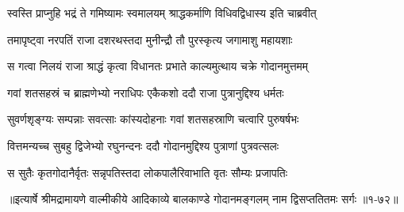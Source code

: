\twolineshloka
{स्वस्ति प्राप्नुहि भद्रं ते गमिष्यामः स्वमालयम्}
{श्राद्धकर्माणि विधिवद्विधास्य इति चाब्रवीत्} %

\twolineshloka
{तमापृष्ट्वा नरपतिं राजा दशरथस्तदा}
{मुनीन्द्रौ तौ पुरस्कृत्य जगामाशु महायशाः} %

\twolineshloka
{स गत्वा निलयं राजा श्राद्धं कृत्वा विधानतः}
{प्रभाते काल्यमुत्थाय चक्रे गोदानमुत्तमम्} %

\twolineshloka
{गवां शतसहस्रं च ब्राह्मणेभ्यो नराधिपः}
{एकैकशो ददौ राजा पुत्रानुद्दिश्य धर्मतः} %

\twolineshloka
{सुवर्णशृङ्ग्यः सम्पन्नाः सवत्साः कांस्यदोहनाः}
{गवां शतसहस्राणि चत्वारि पुरुषर्षभः} %

\twolineshloka
{वित्तमन्यच्च सुबहु द्विजेभ्यो रघुनन्दनः}
{ददौ गोदानमुद्दिश्य पुत्राणां पुत्रवत्सलः} %

\twolineshloka
{स सुतैः कृतगोदानैर्वृतः सन्नृपतिस्तदा}
{लोकपालैरिवाभाति वृतः सौम्यः प्रजापतिः} %


॥इत्यार्षे श्रीमद्रामायणे वाल्मीकीये आदिकाव्ये बालकाण्डे गोदानमङ्गलम् नाम द्विसप्ततितमः सर्गः ॥१-७२॥
